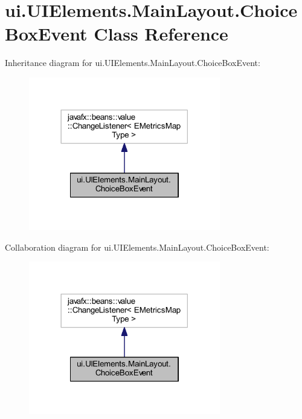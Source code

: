 \hypertarget{classui_1_1_u_i_elements_1_1_main_layout_1_1_choice_box_event}{}\section{ui.\+U\+I\+Elements.\+Main\+Layout.\+Choice\+Box\+Event Class Reference}
\label{classui_1_1_u_i_elements_1_1_main_layout_1_1_choice_box_event}


Inheritance diagram for ui.\+U\+I\+Elements.\+Main\+Layout.\+Choice\+Box\+Event\+:
\nopagebreak
\begin{figure}[H]
\begin{center}
\leavevmode
\includegraphics[width=237pt]{classui_1_1_u_i_elements_1_1_main_layout_1_1_choice_box_event__inherit__graph}
\end{center}
\end{figure}


Collaboration diagram for ui.\+U\+I\+Elements.\+Main\+Layout.\+Choice\+Box\+Event\+:
\nopagebreak
\begin{figure}[H]
\begin{center}
\leavevmode
\includegraphics[width=237pt]{classui_1_1_u_i_elements_1_1_main_layout_1_1_choice_box_event__coll__graph}
\end{center}
\end{figure}
